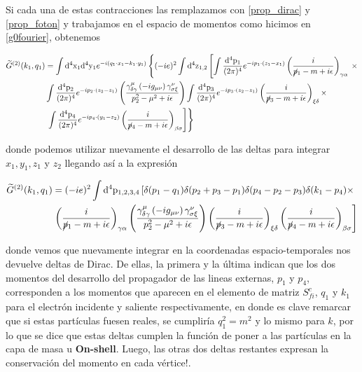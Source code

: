 \documentclass{article}
\numberwithin{equation}{section}
\begin{document}
Si cada una de estas contracciones las remplazamos con \ref{prop_dirac} y \ref{prop_foton} y trabajamos
en el espacio de momentos como hicimos en \ref{g0fourier}, obtenemos

\begin{equation}\label{key}
\begin{aligned}
\widetilde{G}^{(2)}(k_{1},q_{1})&=\int \mathrm{d^4x_1}\mathrm{d^4y_1} e^{-i (q_1 \cdot x_1-k_1 \cdot y_1)} \left\{  (-ie)^{2}\int \mathrm{\mathrm{d^4}z_{1,2}}  \left[  \int\frac{\mathrm{\mathrm{d^4}p_1}}{(2\pi)^{4}}e^{-ip_1\cdot(z_{1}-x_{1})}\left(\frac{i}{\cancel{p}_1-m+i\epsilon}\right)_{\gamma\alpha} \right. \right. \times \\ &\int\frac{\mathrm{\mathrm{d^4}p_2}}{(2\pi)^{4}}e^{-ip_2\cdot(z_2-z_1)}\left(\frac{\gamma_{\delta\gamma}^{\mu} \left(-ig_{\mu\nu}\right) \gamma_{\sigma\xi}^{\nu}}{p^2_2 -\mu^2 +i\epsilon}\right) \int\frac{\mathrm{\mathrm{d^4}p_3}}{(2\pi)^{4}}e^{-ip_3\cdot(z_{2}-z_{1})}\left(\frac{i}{\cancel{p}_3-m+i\epsilon}\right)_{\xi\delta} \times \\
& \left. \left. \int\frac{\mathrm{\mathrm{d^4}p_4}}{(2\pi)^{4}}e^{-ip_4\cdot(y_{1}-z_{2})}\left(\frac{i}{\cancel{p}_4-m+i\epsilon}\right)_{\beta\sigma}  \right]  \right\}
\end{aligned}
\end{equation}

donde podemos utilizar nuevamente el desarrollo de las deltas para integrar $ x_1, y_1, z_1 $ y $ z_2 $  llegando así a la expresión

\begin{equation}\label{key}
\begin{aligned}
\widetilde{G}^{(2)}(k_{1},q_{1})&=(-ie)^{2} \int \mathrm{\mathrm{d^4}p_{1,2,3,4}}  \left[  \delta (p_1 -q_1) \delta(p_2 + p_3 - p_1) \delta (p_4 - p_2 - p_3) \delta (k_1 - p_4) \times \right.\\
& \left. \left(\frac{i}{\cancel{p}_1-m+i\epsilon}\right)_{\gamma\alpha} \left(\frac{\gamma_{\delta\gamma}^{\mu} \left(-ig_{\mu\nu}\right) \gamma_{\sigma\xi}^{\nu}}{p^2_2 -\mu^2 +i\epsilon}\right) \left(\frac{i}{\cancel{p}_3-m+i\epsilon}\right)_{\xi\delta} \left(\frac{i}{\cancel{p}_4-m+i\epsilon}\right)_{\beta\sigma}  \right] 
\end{aligned}
\end{equation}

donde vemos que nuevamente integrar en la coordenadas espacio-temporales nos devuelve deltas de Dirac. De ellas, la primera y la última indican que los dos momentos del desarrollo del propagador de las lineas externas, $p_{1}$ y $p_{4}$, corresponden a los momentos que aparecen en el elemento de matriz $S_{fi}^{c}$, $q_{1}$ y $k_{1}$ para el electrón incidente y saliente respectivamente, en donde es clave remarcar que si estas partículas fuesen reales, se cumpliría $q_{1}^{2}=m^{2}$ y lo mismo para $k$, por lo que se dice que estas deltas cumplen la función de poner a las partículas en la capa de masa u
\textbf{On-shell}. Luego, las otras dos deltas restantes expresan la conservación del momento en cada vértice!.
\end{document}
